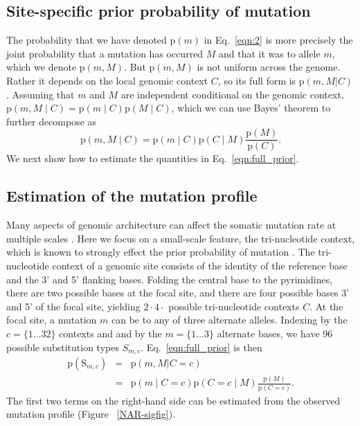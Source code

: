 \documentclass[a4,center,fleqn]{NAR}
\begin{document}
\subsection{Site-specific prior probability of mutation}
The probability that we have denoted $\mathrm{p}(m)$ in Eq.~\ref{eqn:2} is more precisely the joint probability that a mutation has occurred $M$ and that it was to allele $m$, which we denote $\mathrm{p}(m,M)$.
But $\mathrm{p}(m,M)$ is not uniform across the genome.
Rather it depends on the local genomic context $C$, so its full form is $\mathrm{p}(m,M | C)$ \cite{Buisson2019}.
Assuming that $m$ and $M$ are independent conditional on the genomic context, $\mathrm{p}(m,M \mid C) = \mathrm{p}(m \mid C) \mathrm{p}(M \mid C)$, which we can use Bayes' theorem to further decompose as 
\begin{equation}
  \label{eqn:full_prior}
  \mathrm{p}(m,M \mid C) = \mathrm{p}(m \mid C) \mathrm{p}(C \mid M)\frac{\mathrm{p}(M)}{\mathrm{p}(C)}.
\end{equation}
We next show how to estimate the quantities in Eq.~\ref{eqn:full_prior}.

\subsection{Estimation of the mutation profile}
Many aspects of genomic architecture can affect the somatic mutation rate at multiple scales \cite{Buisson2019}.
Here we focus on a small-scale feature, the tri-nucleotide context, which is known to strongly effect the prior probability of mutation \citep{Nik-Zainal2012a,Alexandrov2015,Lee-Six2018}.
The tri-nucleotide context of a genomic site consists of the identity of the reference base and the 3' and 5' flanking bases.
Folding the central base to the pyrimidines, there are two possible bases at the focal site, and there are four possible bases 3' and 5' of the focal site, yielding $2 \cdot 4 \cdot$ possible tri-nucleotide contexts $C$.
At the focal site, a mutation $m$ can be to any of three alternate alleles.
Indexing by the $c=\{1 \dots 32\}$ contexts and and by the $m = \{1 \dots 3\}$ alternate bases, we have 96 possible substitution types $S_{m,c}$.
Eq.~\ref{eqn:full_prior} is then
\begin{equation}
  \label{eqn:detailed_prior}
  \begin{array}{rcl}
  \mathrm{p}(\mathrm{S}_{m,c}) &=&  \mathrm{p}(m, M | C = c) \\
                            &=& \mathrm{p}(m \mid C = c) \mathrm{p}(C = c \mid M)\frac{\mathrm{p}(M)}{\mathrm{p}(C = c)}.
  \end{array}
\end{equation}
The first two terms on the right-hand side can be estimated from the observed mutation profile (Figure ~\ref{NAR-sigfig}).
\end{document}
